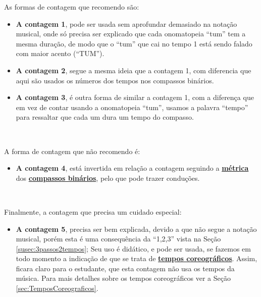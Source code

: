 As formas de contagem que recomendo são:
\begin{itemize}
\item \textbf{A contagem 1},
 pode ser usada sem aprofundar demasiado 
na notação musical, onde só precisa ser explicado que cada onomatopeia ``tum'' tem a mesma duração, 
de modo que  o ``tum'' que cai no tempo 1 está sendo falado com maior acento (``TUM'').
\item \textbf{A contagem 2}, segue a mesma ideia que a contagem 1, 
com diferencia que aqui são usados os números dos tempos nos compassos binários.
\item \textbf{A contagem 3}, 
é outra forma de similar a contagem 1, 
com a diferença que em vez de contar usando a onomatopeia ``tum'',
usamos a palavra ``tempo'' para ressaltar que cada um dura um tempo do compasso. 
\end{itemize}~

A forma de contagem que não recomendo é:
\begin{itemize}
\item \textbf{A contagem 4},
está invertida em relação a contagem seguindo a 
\hyperref[def:Metrica]{\textbf{métrica}} dos \hyperref[subsec:compassobinario]{\textbf{compassos binários}},
pelo que pode trazer conduções.
\end{itemize}~

Finalmente, a contagem que precisa um cuidado especial:
\begin{itemize}
\item \textbf{A contagem 5},
precisa ser bem explicada, 
devido a que não segue a notação musical, 
porém esta é uma consequência da ``1,2,3'' vista na Seção \ref{susec:3passos2tempos}; 
Seu uso é didático, e pode ser usada, se fazemos em todo momento a indicação de 
que se trata de \hyperref[sec:TemposCoreograficos]{\textbf{tempos coreográficos}}.
Assim, ficara claro para o estudante, que esta contagem não usa os tempos da música.
Para mais detalhes sobre os tempos coreográficos ver a Seção \ref{sec:TemposCoreograficos}.
\end{itemize}




